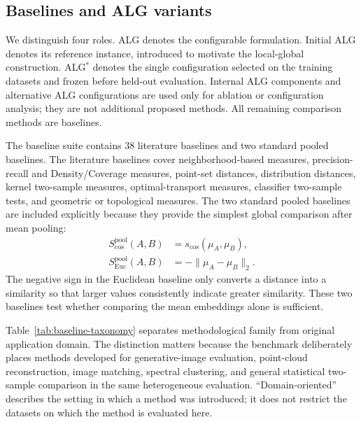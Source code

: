 \documentclass[preprint,12pt]{elsarticle}
\newcommand{\scos}{s_{\mathrm{cos}}}
\begin{document}
\subsection{Baselines and ALG variants}

We distinguish four roles. ALG denotes the configurable formulation. Initial
ALG denotes its reference instance, introduced to motivate the local-global
construction. ALG$^*$ denotes the single configuration selected on the training
datasets and frozen before held-out evaluation. Internal ALG components and
alternative ALG configurations are used only for ablation or configuration
analysis; they are not additional proposed methods. All remaining comparison
methods are baselines.

The baseline suite contains 38 literature baselines and two standard pooled
baselines. The literature baselines cover neighborhood-based measures,
precision-recall and Density/Coverage measures, point-set distances,
distribution distances, kernel two-sample measures, optimal-transport measures,
classifier two-sample tests, and geometric or topological measures. The two
standard pooled baselines are included explicitly because they provide the
simplest global comparison after mean pooling:
\begin{align}
S_{\mathrm{cos}}^{\mathrm{pool}}(A,B)
&= \scos(\mu_A,\mu_B),\\
S_{\mathrm{Euc}}^{\mathrm{pool}}(A,B)
&= -\lVert \mu_A-\mu_B\rVert_2.
\label{eq:pooled-baselines}
\end{align}
The negative sign in the Euclidean baseline only converts a distance into a
similarity so that larger values consistently indicate greater similarity.
These two baselines test whether comparing the mean embeddings alone is
sufficient.

Table~\ref{tab:baseline-taxonomy} separates methodological family from original
application domain. The distinction matters because the benchmark deliberately
places methods developed for generative-image evaluation, point-cloud
reconstruction, image matching, spectral clustering, and general statistical
two-sample comparison in the same heterogeneous evaluation. ``Domain-oriented''
describes the setting in which a method was introduced; it does not restrict
the datasets on which the method is evaluated here.
\end{document}
